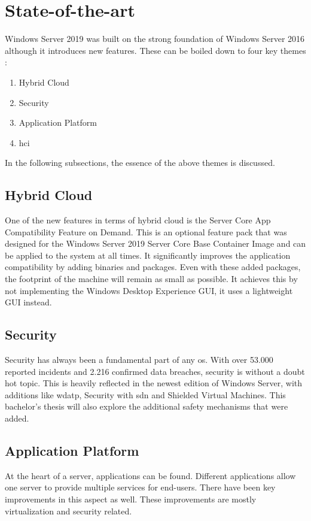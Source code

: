 \section{State-of-the-art}\label{sec:state-of-the-art}
Windows Server 2019 was built on the strong foundation of Windows Server 2016 although it introduces new features. \autocite{Gerend2018}
These can be boiled down to four key themes \autocite{MWST2018}:
\begin{enumerate}
	\item Hybrid Cloud
	\item Security
	\item Application Platform
	\item  \acrfull{hci}
\end{enumerate}
In the following subsections, the essence of the above themes is discussed.
\subsection{Hybrid Cloud}
One of the new features in terms of hybrid cloud is the Server Core App Compatibility Feature on Demand. \autocite{Pacquer2018}
This is an optional feature pack that was designed for the Windows Server 2019 Server Core Base Container Image and can be applied to the system at all times. 
It significantly improves the application compatibility by adding binaries and packages. 
Even with these added packages, the footprint of the machine will remain as small as possible. 
It achieves this by not implementing the Windows Desktop Experience GUI, it uses a lightweight GUI instead.
\subsection{Security}
Security has always been a fundamental part of any \acrshort{os}. 
With over 53.000 reported incidents and 2.216 confirmed data breaches, security is without a doubt hot topic. \autocite{Verizon2018} 
This is heavily reflected in the newest edition of Windows Server, with additions like \acrfull{wdatp}, Security with \acrfull{sdn} and Shielded Virtual Machines. 
This bachelor's thesis will also explore the additional safety mechanisms that were added.
\subsection{Application Platform}
At the heart of a server, applications can be found. 
Different applications allow one server to provide multiple services for end-users. 
There have been key improvements in this aspect as well. 
These improvements are mostly virtualization and security related. 

